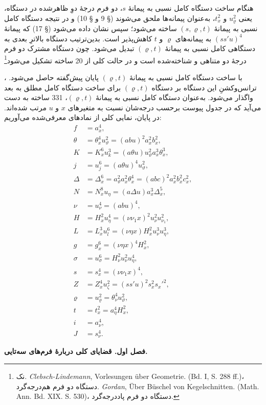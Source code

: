 \documentclass[11pt]{article}
\newcommand{\srcLTR}[1]{\relax\ifmmode\text{\mbox{\babelsublr{\foreignlanguage{english}{#1}}}}\else\babelsublr{\foreignlanguage{english}{#1}}\fi}
\newcommand{\srcfn}[2]{\begingroup\renewcommand{\thefootnote}{\srcLTR{#1}}\footnote{#2}\addtocounter{footnote}{-1}\endgroup}
\begin{document}
هنگام ساخت دستگاه کامل نسبی به پیمانهٔ $s$، دو فرم درجهٔ دوِ ظاهرشده در دستگاه، یعنی $u_\varrho^2$ و $t_x^2$، به‌عنوان پیمانه‌ها ملحق می‌شوند (§ 9 و § 10) و در نتیجه دستگاه کامل نسبی به پیمانهٔ $(s,\varrho,t)$ ساخته می‌شود؛ سپس نشان داده می‌شود (§ 17) که پیمانهٔ $(ss'u)^4$ به پیمانه‌های $\varrho$ و $t$ کاهش‌پذیر است. بدین‌ترتیب دستگاه بالاترِ بعدی به دستگاهی کامل نسبی به پیمانهٔ $(\varrho,t)$ تبدیل می‌شود. چون دستگاه مشترک دو فرم درجهٔ دو متناهی و شناخته‌شده است و در حالت کلی از 20 ساخته تشکیل می‌شود\srcfn{*)}{نک. \emph{Clebsch-Lindemann}, Vorlesungen über Geometrie. (Bd. I, S. 288 ff.)، دستگاه دو فرم هم‌درجه‌گرد. \emph{Gordan}, Über Büschel von Kegelschnitten. (Math. Ann. Bd. XIX. S. 530)، دستگاه دو فرم پاددرجه‌گرد.}، با ساخت دستگاه کامل نسبی به پیمانهٔ $(\varrho,t)$ پایان پیش‌گفته حاصل می‌شود. ترانس‌وکشنِ این دستگاه بر دستگاه $(\varrho,t)$ برای ساخت دستگاه کامل مطلق به بعد واگذار می‌شود.
به‌عنوان دستگاه کامل نسبی به پیمانهٔ $(\varrho,t)$، 331 ساخته به دست می‌آید که در جدول پیوست برحسب درجه‌شان نسبت به متغیرهای $x$ و $u$ مرتب شده‌اند.
در پایان، نمایی کلی از نمادهای معرفی‌شده می‌آوریم:
\begin{align*}
f&=a_x^4,\\
\theta&=\theta_x^4u_\vartheta^2=(abu)^2a_x^2b_x^2,\\
K&=K_x^6u_k^3=(a\theta u)u_\vartheta^2a_x^3\theta_x^3,\\
j&=u_j^6=(a\theta u)^4u_\vartheta^2,\\
\Delta&=\Delta_x^6=a_\vartheta^2a_x^2\theta_x^4=(abc)^2a_x^2b_x^2c_x^2,\\
N&=N_x^8u_\eta=(a\Delta u)a_x^3\Delta_x^5,\\
\nu&=u_\nu^4=(abu)^4,\\
H&=H_x^2u_\eta^4=(\nu\nu_1x)^2u_\nu^2u_{\nu_1}^2,\\
L&=L_x^3u_l^6=(\nu\eta x)H_x^2u_\nu^3u_\eta^3,\\
g&=g_x^6=(\nu\eta x)^4H_x^2,\\
\sigma&=u_\sigma^6=H_\nu^2u_\nu^2u_\eta^4,\\
s&=s_x^4=(\nu\nu_1x)^4,\\
Z&=Z_x^4u_\zeta^2=(ss'u)^2s_x^2s_x'^2,\\
\varrho&=u_\varrho^2=\theta_\nu^4u_\vartheta^2,\\
t&=t_x^2=a_\eta^4H_x^2,\\
i&=a_\nu^4,\\
J&=s_\nu^4.
\end{align*}
\begin{center}
{\Large\bfseries فصل اول. \quad قضایای کلی دربارهٔ فرم‌های سه‌تایی.}
\end{center}
\end{document}
